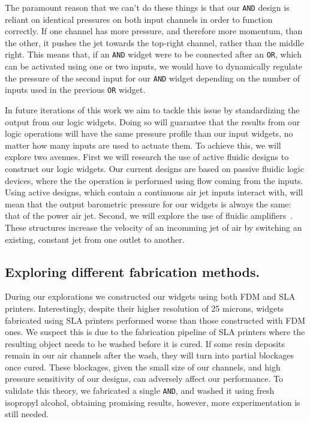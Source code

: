         The paramount reason that we can't do these things is that our
        \texttt{AND} design is reliant on identical pressures on both input
        channels in order to function correctly. If one channel has more
        pressure, and therefore more momentum, than the other, it pushes
        the jet towards the top-right channel, rather than the middle
        right. This means that, if an \texttt{AND} widget were to be
        connected after an \texttt{OR}, which can be activated using one or
        two inputs, we would have to dynamically regulate the pressure of
        the second input for our \texttt{AND} widget depending on the
        number of inputs used in the previous \texttt{OR} widget.

        In future iterations of this work we aim to tackle this issue by
        standardizing the output from our logic widgets. Doing so will
        guarantee that the results from our logic operations will have the
        same pressure profile than our input widgets, no matter how many
        inputs are used to actuate them. To achieve this, we will explore
        two avenues. First we will research the use of active fluidic
        designs to construct our logic widgets. Our current designs are
        based on passive fluidic logic devices, where the the operation is
        performed using flow coming from the inputs. Using active designs, which
        contain a continuous air jet inputs interact with, will mean that the
        output barometric pressure for our widgets is always the same: that of
        the power air jet. Second, we will explore the use of fluidic
        amplifiers~\cite{CharlesBelsterling:1971}.  These structures increase
        the velocity of an incomming jet of air by switching an existing,
        constant jet from one outlet to another.
        
      \subsection{Exploring different fabrication methods.} 
        During our explorations we constructed our widgets using both FDM
        and SLA printers. Interestingly, despite their higher resolution of
        25 microns, widgets fabricated using SLA printers performed worse
        than those constructed with FDM ones. We suspect this is due to the
        fabrication pipeline of SLA printers where the resulting object
        needs to be washed before it is cured. If some resin deposits remain in
        our air channels after the wash, they will turn into partial
        blockages once cured. These blockages, given the small size of our
        channels, and high pressure sensitivity of our designs, can
        adversely affect our performance. To validate this theory, we
        fabricated a single \texttt{AND}, and washed it using fresh
        isopropyl alcohol, obtaining promising results, however, more
        experimentation is still needed.

